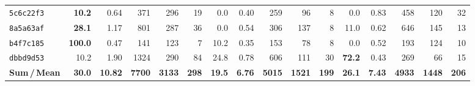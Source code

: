 \documentclass[10pt]{article}
\begin{document}
\begin{longtable}{@{}
    l
    | r r r r r
    | r r r r r
    | r r r r r
  @{}}
\texttt{5c6c22f3}
  & \textbf{10.2} & 0.64 & 371  & 296 &  19
  &  0.0 & 0.40 & 259  &  96 &   8
  &  0.0 & 0.83 & 458  & 120 &  32 \\

\texttt{8a5a63af}
  & \textbf{28.1} & 1.17 & 801  & 287 &  36
  &  0.0 & 0.54 & 306  & 137 &   8
  & 11.0 & 0.62 & 646  & 145 &  13 \\

\texttt{b4f7c185}
  & \textbf{100.0} & 0.47 & 141 & 123 &   7
  & 10.2 & 0.35 & 153  &  78 &   8
  &  0.0 & 0.52 & 193  & 124 &  10 \\

\texttt{dbbd9d53}
  & 10.2 & 1.90 & 1324 & 290 &  84
  & 24.8 & 0.78 & 606  & 111 &  30
  & \textbf{72.2} & 0.43 & 269 &  66 &  15 \\

\midrule
\rowcolor{totalbg}
\textbf{Sum\,/\,Mean}
  & \textbf{30.0} & \textbf{10.82} & \textbf{7700}  & \textbf{3133} & \textbf{298}
  & \textbf{19.5} & \textbf{6.76}  & \textbf{5015}  & \textbf{1521} & \textbf{199}
  & \textbf{26.1} & \textbf{7.43}  & \textbf{4933}  & \textbf{1448} & \textbf{206} \\

\end{longtable}
\end{document}
